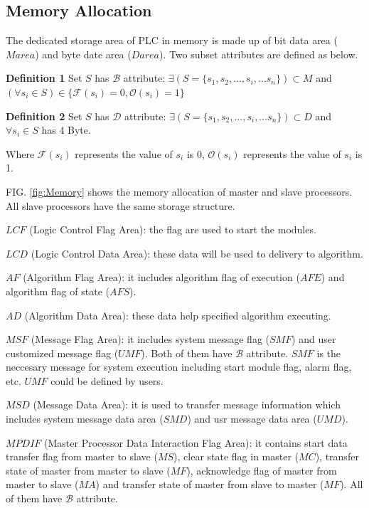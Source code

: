 \documentclass[journal,UTF8]{IEEEtran}
\begin{document}
\subsection{Memory Allocation}  
The dedicated storage area of PLC in memory is made up of bit data area ($M area$) and byte date area ($D area$). Two subset attributes are defined as below.

\textbf{Definition 1} Set $S$ has $\mathcal{B}$ attribute: $\exists (S=\{s_1,s_2,...,s_i,...s_n\}) \subset M$ and $(\forall s_{i} \in S) \in \{\mathcal{F}(s_i) = 0,\mathcal{O}(s_i) = 1\} $

\textbf{Definition 2} Set $S$ has $\mathcal{D}$ attribute: $\exists (S=\{s_1,s_2,...,s_i,...s_n\}) \subset D$ and $\forall s_{i} \in S$ has 4 Byte.

Where $\mathcal{F}(s_i)$ represents the value of $s_i$ is 0, $\mathcal{O}(s_i)$ represents the value of $s_i$ is 1.

FIG. \ref{fig:Memory} shows the memory allocation of master and slave processors. All slave processors have the same storage structure.

\textbf{$LCF$} (Logic Control Flag Area): the flag are used to start the modules.

\textbf{$LCD$} (Logic Control Data Area): these data will be used to delivery to algorithm.

\textbf{$AF$} (Algorithm Flag Area): it includes algorithm flag of execution ($AFE$) and algorithm flag of state ($AFS$).

\textbf{$AD$} (Algorithm Data Area): these data help specified algorithm executing.

\textbf{$MSF$} (Message Flag Area): it includes system message flag ($SMF$) and user customized message flag ($UMF$). Both of them have $\mathcal{B}$ attribute. $SMF$ is the neccesary message for system execution including start module flag, alarm flag, etc. $UMF$ could be defined by users.

\textbf{$MSD$} (Message Data Area): it is used to transfer message information which includes system message data area ($SMD$) and usr message data area ($UMD$).

\textbf{$MPDIF$} (Master Processor Data Interaction Flag Area): it contains start data transfer flag from master to slave ($MS$), clear state flag in master ($MC$), transfer state of master from master to slave ($MF$), acknowledge flag of master from master to slave ($MA$) and transfer state of master from slave to master ($MF$). All of them have $\mathcal{B}$ attribute.
\end{document}
